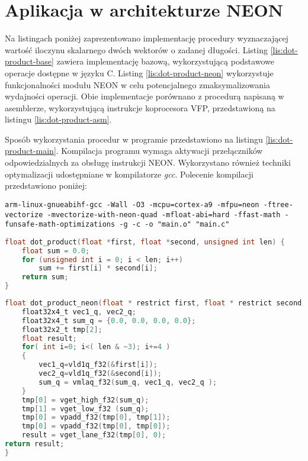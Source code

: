 \section{Aplikacja w architekturze NEON}
\label{cha:neon-source}


Na listingach poniżej zaprezentowano implementację procedury wyznaczającej wartość iloczynu skalarnego dwóch wektorów o zadanej długości. 
Listing \ref{lis:dot-product-base} zawiera implementację bazową, wykorzystującą podstawowe operacje dostępne w języku C.
Listing \ref{lis:dot-product-neon} wykorzystuje funkcjonalności modułu NEON w celu potencjalnego zmaksymalizowania wydajności operacji. 
Obie implementacje porównano z procedurą napisaną w asemblerze, wykorzystującą instrukcje koprocesora VFP, przedstawioną na listingu \ref{lis:dot-product-asm}.

Sposób wykorzystania procedur w programie przedstawiono na listingu \ref{lis:dot-product-main}. 
Kompilacja programu wymaga aktywacji przełączników odpowiedzialnych za obsługę instrukcji NEON. 
Wykorzystano również techniki optymalizacji udostępniane w kompilatorze \textit{gcc}. 
Polecenie kompilacji przedstawiono poniżej:

\begin{lstlisting}[breaklines=true]
arm-linux-gnueabihf-gcc -Wall -O3 -mcpu=cortex-a9 -mfpu=neon -ftree-vectorize -mvectorize-with-neon-quad -mfloat-abi=hard -ffast-math -funsafe-math-optimizations -g -c -o "main.o" "main.c"
\end{lstlisting}

\begin{lstlisting}[breaklines=true, language=C, caption=Implementacja bazowa., label=lis:dot-product-base]
float dot_product(float *first, float *second, unsigned int len) {
	float sum = 0.0;
	for (unsigned int i = 0; i < len; i++)
		sum += first[i] * second[i];
	return sum;
}
\end{lstlisting}

\begin{lstlisting}[breaklines=true, language=C, caption=Implementacja w architekturze NEON. (Źródło: \cite{xilinx-neon}), label=lis:dot-product-neon]
float dot_product_neon(float * restrict first, float * restrict second, unsigned int len) {
	float32x4_t vec1_q, vec2_q;
	float32x4_t sum_q = {0.0, 0.0, 0.0, 0.0};
	float32x2_t tmp[2];
	float result;
	for( int i=0; i<( len & ~3); i+=4 )
	{
		vec1_q=vld1q_f32(&first[i]);
		vec2_q=vld1q_f32(&second[i]);
		sum_q = vmlaq_f32(sum_q, vec1_q, vec2_q );
	}
	tmp[0] = vget_high_f32(sum_q);
	tmp[1] = vget_low_f32 (sum_q);
	tmp[0] = vpadd_f32(tmp[0], tmp[1]);
	tmp[0] = vpadd_f32(tmp[0], tmp[0]);
	result = vget_lane_f32(tmp[0], 0);
return result;
}
\end{lstlisting}

